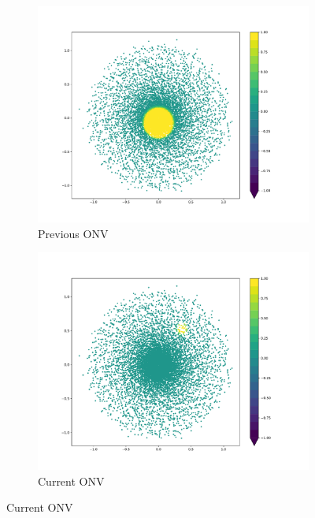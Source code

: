 \documentclass [MS] {UCLAthesis}
\begin{document}
\begin{figure}
    \centering
    \begin{subfigure}[b]{0.49\textwidth}
        \centering
        \includegraphics[width=\textwidth]{onv_normal_prev}
        \caption{Previous ONV}
        \label{fig:onv_prev}
    \end{subfigure}
    \hfill
    \begin{subfigure}[b]{0.49\textwidth}
        \centering
        \includegraphics[width=\textwidth]{onv_normal_cur}
        \caption{Current ONV}
        \label{fig:onv_cur}
    \end{subfigure}

\end{figure}
\end{document}
